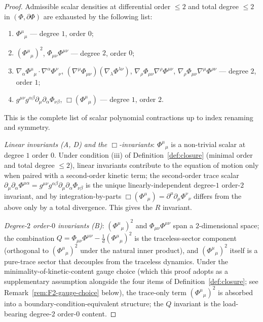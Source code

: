 \documentclass[12pt]{article}
\theoremstyle{definition}
\theoremstyle{remark}
\begin{document}
\begin{proof}
Admissible scalar densities at differential order $\le 2$ and total degree $\le 2$ in $(\Phi, \partial\Phi)$ are exhausted by the following list:
\begin{enumerate}
\item[(A)] $\Phi^\mu{}_\mu$ --- degree $1$, order $0$;
\item[(B)] $(\Phi^\mu{}_\mu)^2$, $\Phi_{\mu\nu}\Phi^{\mu\nu}$ --- degree $2$, order $0$;
\item[(C)] $\nabla_\alpha \Phi^\mu{}_\mu \cdot \nabla^\alpha \Phi^\nu{}_\nu$, $(\nabla^\mu \Phi_{\mu\nu}) (\nabla_\lambda \Phi^{\lambda\nu})$, $\nabla_\rho \Phi_{\mu\nu} \nabla^\rho \Phi^{\mu\nu}$, $\nabla_\rho \Phi_{\mu\nu} \nabla^\mu \Phi^{\rho\nu}$ --- degree $2$, order $1$;
\item[(D)] $g^{\mu\nu} g^{\alpha\beta} \partial_\mu \partial_\alpha \Phi_{\nu\beta}$, $\Box (\Phi^\mu{}_\mu)$ --- degree $1$, order $2$.
\end{enumerate}
This is the complete list of scalar polynomial contractions up to index renaming and symmetry.

\emph{Linear invariants (A, D) and the $\Box$-invariants}: $\Phi^\mu{}_\mu$ is a non-trivial scalar at degree $1$ order $0$. Under condition (iii) of Definition~\ref{def:closure} (minimal order and total degree $\le 2$), linear invariants contribute to the equation of motion only when paired with a second-order kinetic term; the second-order trace scalar $\partial_\mu \partial_\alpha \Phi^{\mu\alpha} = g^{\mu\nu} g^{\alpha\beta} \partial_\mu \partial_\alpha \Phi_{\nu\beta}$ is the unique linearly-independent degree-$1$ order-$2$ invariant, and by integration-by-parts $\Box (\Phi^\mu{}_\mu) = \partial^\mu \partial_\mu \Phi^\nu{}_\nu$ differs from the above only by a total divergence. This gives the $R$ invariant.

\emph{Degree-$2$ order-$0$ invariants (B)}: $(\Phi^\mu{}_\mu)^2$ and $\Phi_{\mu\nu}\Phi^{\mu\nu}$ span a $2$-dimensional space; the combination $Q = \Phi_{\mu\nu}\Phi^{\mu\nu} - \tfrac{1}{d}(\Phi^\mu{}_\mu)^2$ is the traceless-sector component (orthogonal to $(\Phi^\mu{}_\mu)^2$ under the natural inner product), and $(\Phi^\mu{}_\mu)^2$ itself is a pure-trace sector that decouples from the traceless dynamics. Under the minimality-of-kinetic-content gauge choice (which this proof adopts as a supplementary assumption alongside the four items of Definition~\ref{def:closure}; see Remark~\ref{rem:F2-gauge-choice} below), the trace-only term $(\Phi^\mu{}_\mu)^2$ is absorbed into a boundary-condition-equivalent structure; the $Q$ invariant is the load-bearing degree-$2$ order-$0$ content.


\end{proof}
\end{document}
